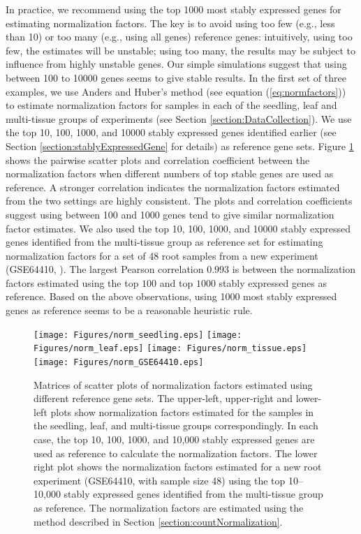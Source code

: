 \documentclass[letterpaper,12pt]{article}
\begin{document}
In practice, we recommend using the top 1000 most stably expressed genes for
estimating normalization factors. The key is to avoid using too few (e.g.,
less than 10) or too many (e.g., using all genes) reference genes:
intuitively, using too few, the estimates will be unstable; using too many,
the results may be subject to influence from highly unstable genes.
Our simple simulations suggest that using between 100 to 10000 genes seems to
give stable results. In the first set of three examples, we use Anders and
Huber's method (see equation (\ref{eq:normfactors})) to estimate normalization
factors for samples in each of the seedling, leaf and multi-tissue groups of
experiments (see Section \ref{section:DataCollection}).  We use the top 10,
100, 1000, and 10000 stably expressed genes identified earlier (see Section
\ref{section:stablyExpressedGene} for details) as reference gene sets. Figure
\ref{fig:normfactor} shows the pairwise scatter plots and correlation
coefficient between the normalization factors when different numbers of top
stable genes are used as reference. A stronger correlation indicates the
normalization factors estimated from the two settings are highly consistent.
The plots and correlation coefficients suggest using between 100 and 1000
genes tend to give similar normalization factor estimates. We also used the
top 10, 100, 1000, and 10000 stably expressed genes identified from the
multi-tissue group as reference set for estimating normalization factors for a set
of 48 root samples from a new experiment (GSE64410, \cite{vragovic2015translatome}). The largest Pearson correlation
$0.993$ is between the normalization factors estimated using the top $100$
and top $1000$ stably expressed genes as reference. Based on the above
observations, using 1000 most stably expressed genes as reference seems to be
a reasonable heuristic rule.




\begin{figure}[!ht]
	\begin{center}
		\texttt{[image: Figures/norm\_seedling.eps]}
		\texttt{[image: Figures/norm\_leaf.eps]}
		\texttt{[image: Figures/norm\_tissue.eps]}
		\texttt{[image: Figures/norm\_GSE64410.eps]}
		\caption{Matrices of scatter plots of normalization factors
		estimated using different reference gene sets. 
		The upper-left, upper-right and lower-left plots show
		normalization factors estimated for the samples in the
		seedling, leaf, and multi-tissue groups correspondingly. 
		In each case, the top 10, 100, 1000, and 10,000 stably
		expressed genes are used as reference to
		calculate the normalization factors.
		The lower right plot shows the normalization factors estimated for a new root
		experiment (GSE64410, with sample size 48) using the top 10--10,000
		stably expressed genes identified from the multi-tissue group as
		reference. The normalization factors are estimated using the
		method described in Section \ref{section:countNormalization}.}
		\label{fig:normfactor} \end{center} \end{figure}
\end{document}
